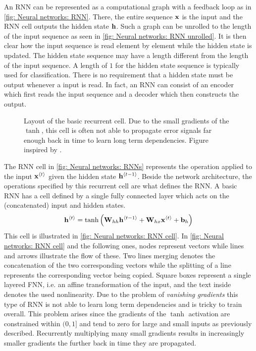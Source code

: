 An \gls{RNN} can be represented as a computational graph with a feedback loop as in \autoref{fig: Neural networks: RNN}. There, the entire sequence ${\mathbf{x}}$ is the input and the RNN cell outputs the hidden state ${\mathbf{h}}$. Such a graph can be unrolled to the length of the input sequence as seen in \autoref{fig: Neural networks: RNN unrolled}. It is then clear how the input sequence is read element by element while the hidden state is updated. The hidden state sequence may have a length different from the length of the input sequence. A length of $1$ for the hidden state sequence is typically used for classification. There is no requirement that a hidden state must be output whenever a input is read. In fact, an \gls{RNN} can consist of an encoder which first reads the input sequence and a decoder which then constructs the output.
\begin{figure}[tbp!]
    \centering
    
    \caption{Layout of the basic recurrent cell. Due to the small gradients of the $\tanh$, this cell is often not able to propagate error signals far enough back in time to learn long term dependencies. Figure inspired by \cite{Olah2015}.}
    \label{fig: Neural networks: RNN cell}
\end{figure}
The RNN cell in \autoref{fig: Neural networks: RNNs} represents the operation applied to the input ${\mathbf{x}}^{\left\langle t\right\rangle}$ given the hidden state ${\mathbf{h}}^{\left\langle t-1\right\rangle}$. Beside the network architecture, the operations specified by this recurrent cell are what defines the \gls{RNN}. A basic \gls{RNN} has a cell defined by a single fully connected layer which acts on the (concatenated) input and hidden states.
\begin{equation}
    {\mathbf{h}}^{\left\langle t\right\rangle} = \tanh{\left({\mathbf{W}}_{hh}{\mathbf{h}}^{\left\langle t-1\right\rangle}+{\mathbf{W}}_{hx}{\mathbf{x}}^{\left\langle t\right\rangle}+{\mathbf{b}}_h\right)}
\end{equation}
This cell is illustrated in \autoref{fig: Neural networks: RNN cell}. In \autoref{fig: Neural networks: RNN cell} and the following ones, nodes represent vectors while lines and arrows illustrate the flow of these. Two lines merging denotes the concatenation of the two corresponding vectors while the splitting of a line represents the corresponding vector being copied. Square boxes represent a single layered \gls{FNN}, i.e. an affine transformation of the input, and the text inside denotes the used nonlinearity.
Due to the problem of \textit{vanishing gradients} this type of \gls{RNN} is not able to learn long term dependencies and is tricky to train overall. This problem arises since the gradients of the $\tanh$ activation are constrained within $(0,1]$ and tend to zero for large and small inputs as previously described. Recurrently multiplying many small gradients results in increasingly smaller gradients the further back in time they are propagated.

